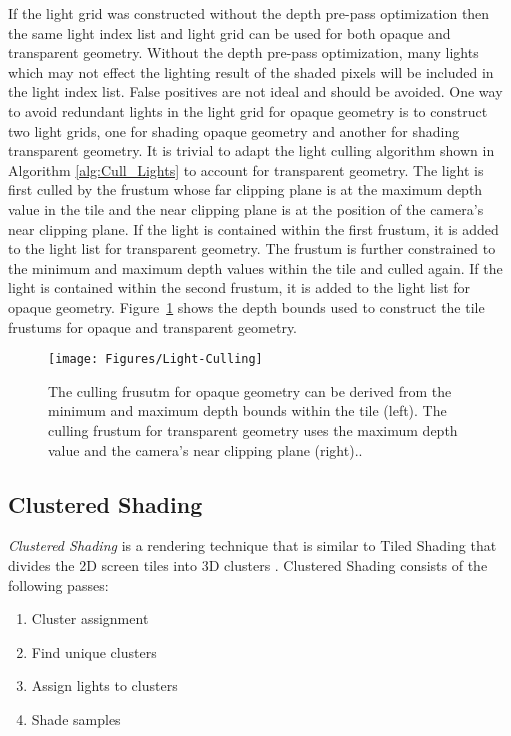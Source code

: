 If the light grid was constructed without the depth pre-pass optimization then the same light index list and light grid can be used for both opaque and transparent geometry. Without the depth pre-pass optimization, many lights which may not effect the lighting result of the shaded pixels will be included in the light index list. False positives are not ideal and should be avoided. One way to avoid redundant lights in the light grid for opaque geometry is to construct two light grids, one for shading opaque geometry and another for shading transparent geometry. It is trivial to adapt the light culling algorithm shown in Algorithm \ref{alg:Cull_Lights} to account for transparent geometry. The light is first culled by the frustum whose far clipping plane is at the maximum depth value in the tile and the near clipping plane is at the position of the camera's near clipping plane. If the light is contained within the first frustum, it is added to the light list for transparent geometry. The frustum is further constrained to the minimum and maximum depth values within the tile and culled again. If the light is contained within the second frustum, it is added to the light list for opaque geometry. Figure~\ref{fig:Light-Culling} shows the depth bounds used to construct the tile frustums for opaque and transparent geometry.

\begin{figure}[H]
\centering
\texttt{[image: Figures/Light-Culling]}
\decoRule
\caption[Light Culling]{The culling frusutm for opaque geometry can be derived from the minimum and maximum depth bounds within the tile (left). The culling frustum for transparent geometry uses the maximum depth value and the camera's near clipping plane (right).\parencite{17_vanoosten_2015}.}
\label{fig:Light-Culling}
\end{figure}



\subsection{Clustered Shading}

\emph{Clustered Shading} is a rendering technique that is similar to Tiled Shading that divides the 2D screen tiles into 3D clusters \parencite{20_olsson_2012}. Clustered Shading consists of the following passes:

\begin{enumerate}
\item{Cluster assignment}
\item{Find unique clusters}
\item{Assign lights to clusters}
\item{Shade samples}
\end{enumerate}

